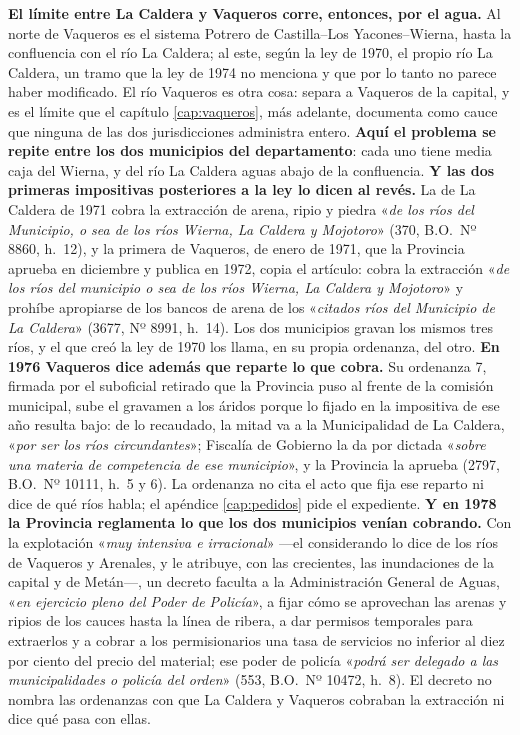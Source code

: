 \textbf{El límite entre La Caldera y Vaqueros corre, entonces, por el agua.} Al norte de Vaqueros es el sistema Potrero de Castilla--Los Yacones--Wierna, hasta la confluencia con el río La Caldera; al este, según la ley de 1970, el propio río La Caldera, un tramo que la ley de 1974 no menciona y que por lo tanto no parece haber modificado. El río Vaqueros es otra cosa: separa a Vaqueros de la capital, y es el límite que el capítulo \ref{cap:vaqueros}, más adelante, documenta como cauce que ninguna de las dos jurisdicciones administra entero. \textbf{Aquí el problema se repite entre los dos municipios del departamento}: cada uno tiene media caja del Wierna, y del río La Caldera aguas abajo de la confluencia. \textbf{Y las dos primeras impositivas posteriores a la ley lo dicen al revés.} La de La Caldera de 1971 cobra la extracción de arena, ripio y piedra «\textit{de los ríos del Municipio, o sea de los ríos Wierna, La Caldera y Mojotoro}» (370, B.O.\ Nº 8860, h.\ 12), y la primera de Vaqueros, de enero de 1971, que la Provincia aprueba en diciembre y publica en 1972, copia el artículo: cobra la extracción «\textit{de los ríos del municipio o sea de los ríos Wierna, La Caldera y Mojotoro}» y prohíbe apropiarse de los bancos de arena de los «\textit{citados ríos del Municipio de La Caldera}» (3677, Nº 8991, h.\ 14). Los dos municipios gravan los mismos tres ríos, y el que creó la ley de 1970 los llama, en su propia ordenanza, del otro. \textbf{En 1976 Vaqueros dice además que reparte lo que cobra.} Su ordenanza 7, firmada por el suboficial retirado que la Provincia puso al frente de la comisión municipal, sube el gravamen a los áridos porque lo fijado en la impositiva de ese año resulta bajo: de lo recaudado, la mitad va a la Municipalidad de La Caldera, «\textit{por ser los ríos circundantes}»; Fiscalía de Gobierno la da por dictada «\textit{sobre una materia de competencia de ese municipio}», y la Provincia la aprueba (2797, B.O.\ Nº 10111, h.\ 5 y 6). La ordenanza no cita el acto que fija ese reparto ni dice de qué ríos habla; el apéndice \ref{cap:pedidos} pide el expediente. \textbf{Y en 1978 la Provincia reglamenta lo que los dos municipios venían cobrando.} Con la explotación «\textit{muy intensiva e irracional}» ---el considerando lo dice de los ríos de Vaqueros y Arenales, y le atribuye, con las crecientes, las inundaciones de la capital y de Metán---, un decreto faculta a la Administración General de Aguas, «\textit{en ejercicio pleno del Poder de Policía}», a fijar cómo se aprovechan las arenas y ripios de los cauces hasta la línea de ribera, a dar permisos temporales para extraerlos y a cobrar a los permisionarios una tasa de servicios no inferior al diez por ciento del precio del material; ese poder de policía «\textit{podrá ser delegado a las municipalidades o policía del orden}» (553, B.O.\ Nº 10472, h.\ 8). El decreto no nombra las ordenanzas con que La Caldera y Vaqueros cobraban la extracción ni dice qué pasa con ellas.

